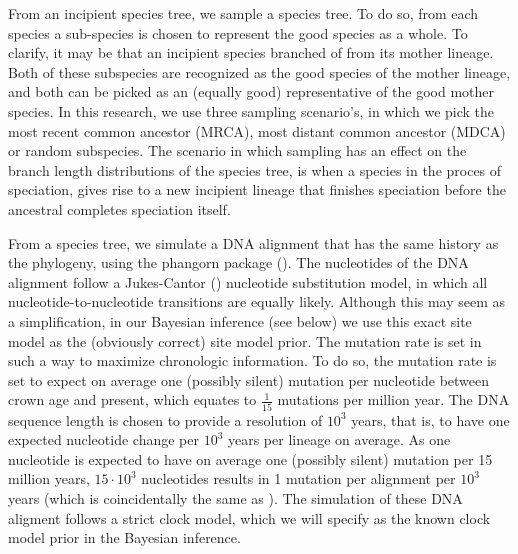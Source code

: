 \documentclass{article}
\begin{document}
From an incipient species tree, we sample a species tree. To do
so, from each species a sub-species is chosen to represent
the good species as a whole. To clarify, it may be that an
incipient species branched of from its mother lineage. 
Both of these subspecies are recognized as the good species of the 
mother lineage, and both can be picked as an (equally good) representative of the 
good mother species. 
In this research, we use three sampling scenario's,
in which we pick the most recent common ancestor (MRCA), 
most distant common ancestor (MDCA) or random subspecies. 
The scenario in which sampling has an effect on the branch length
distributions of the species tree, is when a species in the proces
of speciation, gives rise to a new incipient lineage that finishes
speciation before the ancestral completes speciation itself.

From a species tree, we simulate a DNA alignment that has the same history
as the phylogeny, using the phangorn package (\cite{phangorn}). 
The nucleotides of the DNA alignment follow a Jukes-Cantor (\cite{jc69})
nucleotide substitution model, in which all nucleotide-to-nucleotide transitions
are equally likely. Although this may seem as a simplification, 
in our Bayesian inference (see below) we use this exact site model as the (obviously correct) site model prior.
The mutation rate is set in such a way to maximize chronologic information.
To do so, the mutation rate is set to expect on average one (possibly silent) mutation per nucleotide
between crown age and present, which equates to $\frac{1}{15}$ mutations
per million year.
The DNA sequence length is chosen to provide a
resolution of $10^3$ years, that is, to have one expected nucleotide change 
per $10^3$ years per lineage on average. As one nucleotide is expected 
to have on average one (possibly silent) mutation per 15 million years, $15 \cdot 10^3$
nucleotides results in 1 mutation per alignment per $10^3$ years (which is
coincidentally the same as \cite{moller2018}). 
The simulation of these DNA aligment follows a strict clock model, 
which we will specify as the known clock model prior in the Bayesian inference.
\end{document}
